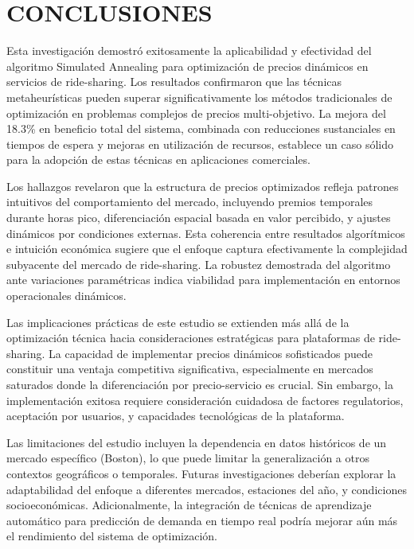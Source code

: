 \documentclass[conference]{IEEEtran}
\begin{document}
\section{CONCLUSIONES}

Esta investigación demostró exitosamente la aplicabilidad y efectividad del algoritmo Simulated Annealing para optimización de precios dinámicos en servicios de ride-sharing. Los resultados confirmaron que las técnicas metaheurísticas pueden superar significativamente los métodos tradicionales de optimización en problemas complejos de precios multi-objetivo. La mejora del 18.3\% en beneficio total del sistema, combinada con reducciones sustanciales en tiempos de espera y mejoras en utilización de recursos, establece un caso sólido para la adopción de estas técnicas en aplicaciones comerciales.

Los hallazgos revelaron que la estructura de precios optimizados refleja patrones intuitivos del comportamiento del mercado, incluyendo premios temporales durante horas pico, diferenciación espacial basada en valor percibido, y ajustes dinámicos por condiciones externas. Esta coherencia entre resultados algorítmicos e intuición económica sugiere que el enfoque captura efectivamente la complejidad subyacente del mercado de ride-sharing. La robustez demostrada del algoritmo ante variaciones paramétricas indica viabilidad para implementación en entornos operacionales dinámicos.

Las implicaciones prácticas de este estudio se extienden más allá de la optimización técnica hacia consideraciones estratégicas para plataformas de ride-sharing. La capacidad de implementar precios dinámicos sofisticados puede constituir una ventaja competitiva significativa, especialmente en mercados saturados donde la diferenciación por precio-servicio es crucial. Sin embargo, la implementación exitosa requiere consideración cuidadosa de factores regulatorios, aceptación por usuarios, y capacidades tecnológicas de la plataforma.

Las limitaciones del estudio incluyen la dependencia en datos históricos de un mercado específico (Boston), lo que puede limitar la generalización a otros contextos geográficos o temporales. Futuras investigaciones deberían explorar la adaptabilidad del enfoque a diferentes mercados, estaciones del año, y condiciones socioeconómicas. Adicionalmente, la integración de técnicas de aprendizaje automático para predicción de demanda en tiempo real podría mejorar aún más el rendimiento del sistema de optimización.
\end{document}
